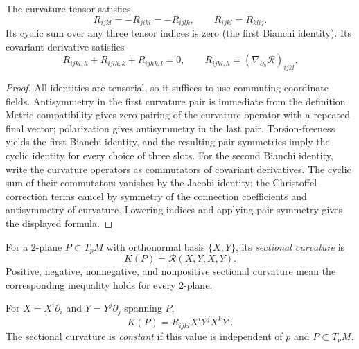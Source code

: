 \begin{lemma}
\label{claim:curvature-symmetries-bianchi}


\label{Bianchi}



The curvature tensor satisfies
\[
  R_{ijkl}=-R_{jikl}=-R_{ijlk},
  \qquad R_{ijkl}=R_{klij}.
\]
Its cyclic sum over any three tensor indices is zero (the first Bianchi
identity). Its covariant derivative satisfies
\[
  R_{ijkl,h}+R_{ijlh,k}+R_{ijhk,l}=0,
  \qquad
  R_{ijkl,h}=(\nabla_{\partial_h}\mathcal R)_{ijkl}.
\]
\end{lemma}

\begin{proof}
\sketch
{}

All identities are tensorial, so it suffices to use commuting coordinate fields. Antisymmetry in the first curvature pair is immediate from the definition. Metric compatibility gives zero pairing of the curvature operator with a repeated final vector; polarization gives antisymmetry in the last pair. Torsion-freeness yields the first Bianchi identity, and the resulting pair symmetries imply the cyclic identity for every choice of three slots. For the second Bianchi identity, write the curvature operators as commutators of covariant derivatives. The cyclic sum of their commutators vanishes by the Jacobi identity; the Christoffel correction terms cancel by symmetry of the connection coefficients and antisymmetry of curvature. Lowering indices and applying pair symmetry gives the displayed formula.
\end{proof}


\begin{definition}
\label{def:sectional-curvature}





For a $2$-plane $P\subset T_pM$ with orthonormal basis $\{X,Y\}$,
its \emph{sectional curvature} is
\[
  K(P)=\mathcal R(X,Y,X,Y).
\]
Positive, negative, nonnegative, and nonpositive sectional curvature
mean the corresponding inequality holds for every $2$-plane.
\end{definition}

For $X=X^i\partial_i$ and $Y=Y^j\partial_j$ spanning $P$,
\[
  K(P)=R_{ijkl}X^iY^jX^kY^l.
\]
The sectional curvature is \emph{constant} if this value is independent
of $p$ and $P\subset T_pM$.

